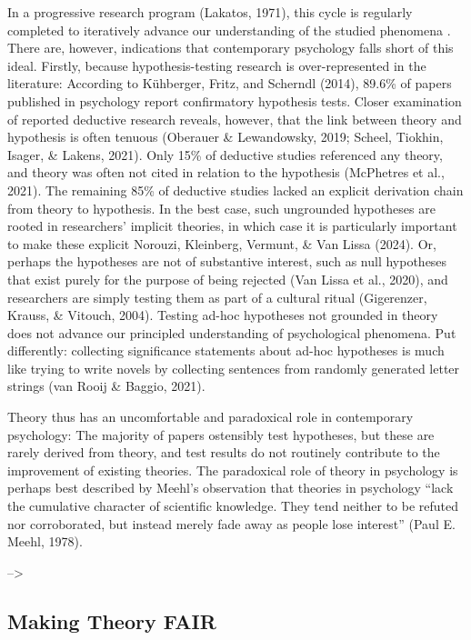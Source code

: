 \documentclass[
  man,floatsintext]{apa6}
\begin{document}
In a progressive research program (Lakatos, 1971),
this cycle is regularly completed to iteratively advance our understanding of the studied phenomena
.
There are, however, indications that contemporary psychology falls short of this ideal.
Firstly, because hypothesis-testing research is over-represented in the literature:
According to Kühberger, Fritz, and Scherndl (2014), 89.6\% of papers published in psychology report confirmatory hypothesis tests.
Closer examination of reported deductive research reveals, however, that the link between theory and hypothesis is often tenuous (Oberauer \& Lewandowsky, 2019; Scheel, Tiokhin, Isager, \& Lakens, 2021).
Only 15\% of deductive studies referenced any theory, and theory was often not cited in relation to the hypothesis (McPhetres et al., 2021).
The remaining 85\% of deductive studies lacked an explicit derivation chain from theory to hypothesis.
In the best case, such ungrounded hypotheses are rooted in researchers' implicit theories, in which case it is particularly important to make these explicit Norouzi, Kleinberg, Vermunt, \& Van Lissa (2024).
Or, perhaps the hypotheses are not of substantive interest, such as null hypotheses that exist purely for the purpose of being rejected (Van Lissa et al., 2020), and researchers are simply testing them as part of a cultural ritual (Gigerenzer, Krauss, \& Vitouch, 2004).
Testing ad-hoc hypotheses not grounded in theory does not advance our principled understanding of psychological phenomena.
Put differently: collecting significance statements about ad-hoc hypotheses is much like trying to write novels by collecting sentences from randomly generated letter strings (van Rooij \& Baggio, 2021).

Theory thus has an uncomfortable and paradoxical role in contemporary psychology:
The majority of papers ostensibly test hypotheses,
but these are rarely derived from theory,
and test results do not routinely contribute to the improvement of existing theories.
The paradoxical role of theory in psychology is perhaps best described by Meehl's observation that theories in psychology ``lack the cumulative character of scientific knowledge. They tend neither to be refuted nor corroborated, but instead merely fade away as people lose interest'' (Paul E. Meehl, 1978).

--\textgreater{}

\subsection{Making Theory FAIR}\label{making-theory-fair}
\end{document}
